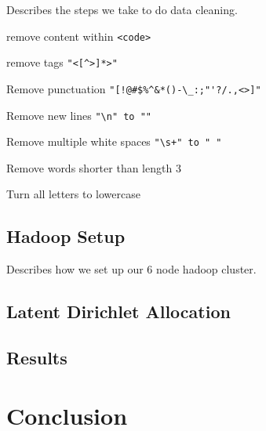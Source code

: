 \documentclass{article}
\begin{document}
Describes the steps we take to do data cleaning.

remove content within \verb+<code>+

remove tags \verb+"<[^>]*>"+

Remove punctuation \verb+"[!@#$%^&*()-\_:;"'?/.,<>]"+

Remove new lines \verb+"\n" to ""+

Remove multiple white spaces \verb-"\s+" to " "-

Remove words shorter than length 3

Turn all letters to lowercase
\subsection{Hadoop Setup}

Describes how we set up our 6 node hadoop cluster.

\subsection{Latent Dirichlet Allocation}

\subsection{Results}

\section{Conclusion}


\end{document}
